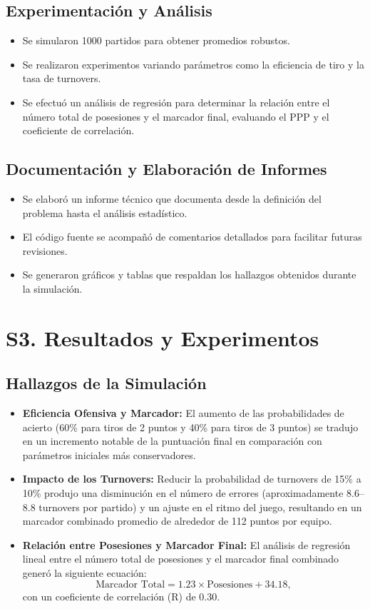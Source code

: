 \documentclass[12pt]{article}
\begin{document}
\subsection{Experimentación y Análisis}
\begin{itemize}
    \item Se simularon 1000 partidos para obtener promedios robustos.
    \item Se realizaron experimentos variando parámetros como la eficiencia de tiro y la tasa de turnovers.
    \item Se efectuó un análisis de regresión para determinar la relación entre el número total de posesiones y el marcador final, evaluando el PPP y el coeficiente de correlación.
\end{itemize}

\subsection{Documentación y Elaboración de Informes}
\begin{itemize}
    \item Se elaboró un informe técnico que documenta desde la definición del problema hasta el análisis estadístico.
    \item El código fuente se acompañó de comentarios detallados para facilitar futuras revisiones.
    \item Se generaron gráficos y tablas que respaldan los hallazgos obtenidos durante la simulación.
\end{itemize}

\newpage

\section{S3. Resultados y Experimentos}

\subsection{Hallazgos de la Simulación}
\begin{itemize}
    \item \textbf{Eficiencia Ofensiva y Marcador:} El aumento de las probabilidades de acierto (60\% para tiros de 2 puntos y 40\% para tiros de 3 puntos) se tradujo en un incremento notable de la puntuación final en comparación con parámetros iniciales más conservadores.
    \item \textbf{Impacto de los Turnovers:} Reducir la probabilidad de turnovers de 15\% a 10\% produjo una disminución en el número de errores (aproximadamente 8.6--8.8 turnovers por partido) y un ajuste en el ritmo del juego, resultando en un marcador combinado promedio de alrededor de 112 puntos por equipo.
    \item \textbf{Relación entre Posesiones y Marcador Final:} El análisis de regresión lineal entre el número total de posesiones y el marcador final combinado generó la siguiente ecuación:
    \[
    \text{Marcador Total} = 1.23 \times \text{Posesiones} + 34.18,
    \]
    con un coeficiente de correlación (R) de 0.30.
\end{itemize}
\end{document}
